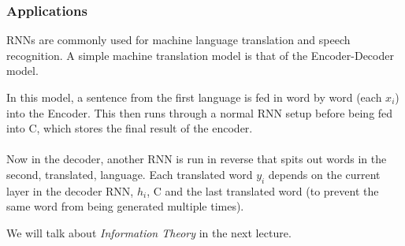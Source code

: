 \documentclass{article}
\begin{document}
\subsubsection{Applications}
RNNs are commonly used for machine language translation and speech recognition. A simple machine translation model is that of the Encoder-Decoder model.

\begin{center}
\end{center}

In this model, a sentence from the first language is fed in word by word (each $x_i$) into the Encoder. This then runs through a normal RNN setup before being fed into C, which stores the final result of the encoder.
\\ \\ \noindent
Now in the decoder, another RNN is run in reverse that spits out words in the second, translated, language. Each translated word  $y_i$ depends on the current layer in the decoder RNN, $h_i$, C and the last translated word (to prevent the same word from being generated multiple times).
\begin{remark}
We will talk about \emph{Information Theory} in the next lecture.
\end{remark}
\end{document}
